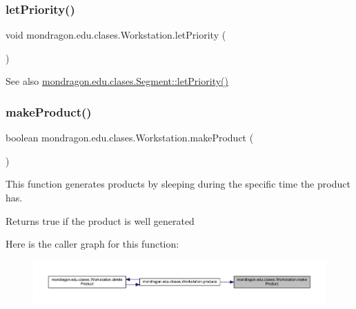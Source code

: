 \subsubsection{\texorpdfstring{letPriority()}{letPriority()}}
{\footnotesize\ttfamily void mondragon.\+edu.\+clases.\+Workstation.\+let\+Priority (\begin{DoxyParamCaption}{ }\end{DoxyParamCaption})\hspace{0.3cm}{\ttfamily [inline]}}

\begin{DoxySeeAlso}{See also}
\mbox{\hyperlink{classmondragon_1_1edu_1_1clases_1_1_segment_af903bad2ccfd51fe2f8d21d437143a1e}{mondragon.\+edu.\+clases.\+Segment\+::let\+Priority()}} 
\end{DoxySeeAlso}
\mbox{\label{classmondragon_1_1edu_1_1clases_1_1_workstation_ae95c8dcf4c2af36a78e6d0c7627114a5}} 
\subsubsection{\texorpdfstring{makeProduct()}{makeProduct()}}
{\footnotesize\ttfamily boolean mondragon.\+edu.\+clases.\+Workstation.\+make\+Product (\begin{DoxyParamCaption}{ }\end{DoxyParamCaption})\hspace{0.3cm}{\ttfamily [inline]}}

This function generates products by sleeping during the specific time the product has.

\begin{DoxyReturn}{Returns}
true if the product is well generated 
\end{DoxyReturn}
Here is the caller graph for this function\+:\nopagebreak
\begin{figure}[H]
\begin{center}
\leavevmode
\includegraphics[width=350pt]{classmondragon_1_1edu_1_1clases_1_1_workstation_ae95c8dcf4c2af36a78e6d0c7627114a5_icgraph}
\end{center}
\end{figure}
\mbox{\label{classmondragon_1_1edu_1_1clases_1_1_workstation_a574730f7c7ff1e429e7d25104eefac42}} 
